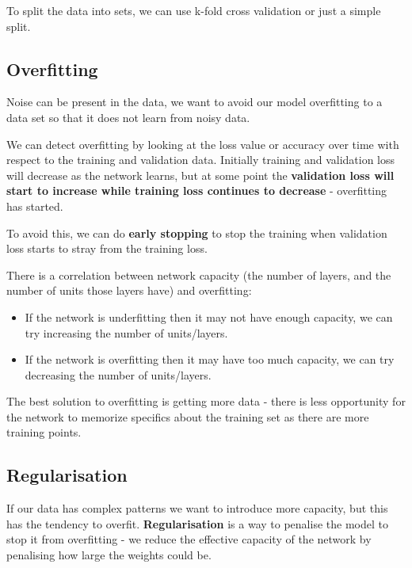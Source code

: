 \documentclass[11pt]{article}
\begin{document}
To split the data into sets, we can use k-fold cross validation or just a simple split.

\subsection{Overfitting}
Noise can be present in the data, we want to avoid our model overfitting to a data set so that it does not learn from noisy data.

We can detect overfitting by looking at the loss value or accuracy over time with respect to the training and validation data.
Initially training and validation loss will decrease as the network learns, but at some point the \textbf{validation loss will start to increase while training loss continues to decrease} - overfitting has started.

To avoid this, we can do \textbf{early stopping} to stop the training when validation loss starts to stray from the training loss.

There is a correlation between network capacity (the number of layers, and the number of units those layers have) and overfitting:
\begin{itemize}
  \item If the network is underfitting then it may not have enough capacity, we can try increasing the number of units/layers.
  \item If the network is overfitting then it may have too much capacity, we can try decreasing the number of units/layers.
\end{itemize}

The best solution to overfitting is getting more data - there is less opportunity for the network to memorize specifics about the training set as there are more training points.

\subsection{Regularisation}
If our data has complex patterns we want to introduce more capacity, but this has the tendency to overfit.
\textbf{Regularisation} is a way to penalise the model to stop it from overfitting - we reduce the effective capacity of the network by penalising how large the weights could be.
\end{document}
